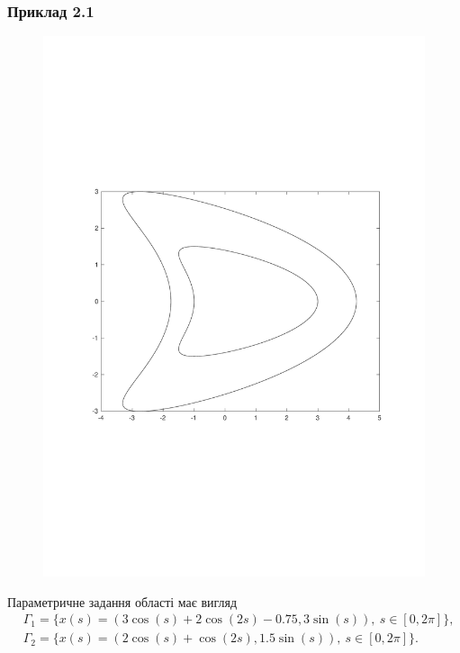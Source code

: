 \documentclass[12pt]{report}
\begin{document}
\subsubsection{Приклад 2.1}
\begin{figure}[h!]
\centering
	\vspace*{-4cm}
	\includegraphics[scale=.5]{sample2.pdf}
	\vspace*{-4cm}
\end{figure}

 Параметричне задання області має вигляд
  \begin{equation*}
 \begin{split}
 	&\Gamma_1= \{x(s)=(3\cos(s) + 2\cos(2s) - 0.75, 3\sin(s)),\ s\in[0,2\pi]\},\\
	&\Gamma_2= \{x(s)=(2\cos(s)+\cos(2s),1.5\sin(s)),\ s\in[0,2\pi]\}.
 \end{split}
 \end{equation*}
 
\end{document}
